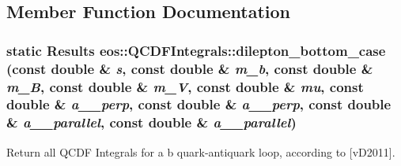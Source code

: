 \subsection{Member Function Documentation}
\hypertarget{classeos_1_1QCDFIntegrals_a4685503430ba2e37d0a950efbb5db144}{
\subsubsection[{dilepton\_\-bottom\_\-case}]{\setlength{\rightskip}{0pt plus 5cm}static {\bf Results} eos::QCDFIntegrals::dilepton\_\-bottom\_\-case (const double \& {\em s}, \/  const double \& {\em m\_\-b}, \/  const double \& {\em m\_\-B}, \/  const double \& {\em m\_\-V}, \/  const double \& {\em mu}, \/  const double \& {\em a\_\_\-perp}, \/  const double \& {\em a\_\_\-perp}, \/  const double \& {\em a\_\_\-parallel}, \/  const double \& {\em a\_\_\-parallel})}}
\label{classeos_1_1QCDFIntegrals_a4685503430ba2e37d0a950efbb5db144}
Return all QCDF Integrals for a b quark-\/antiquark loop, according to \mbox{[}vD2011\mbox{]}.


